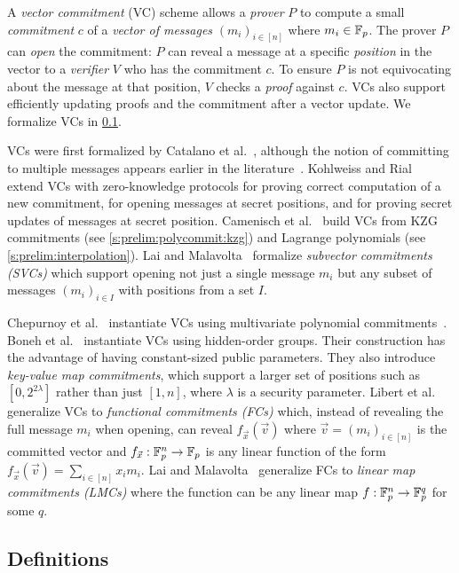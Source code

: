 A \textit{vector commitment} (VC) scheme allows a \textit{prover} $P$ to compute a small \textit{commitment} $c$ of a \textit{vector of messages} $(m_i)_{i\in[n]}$ where $m_i\in \mathbb{F}_p$.
The prover $P$ can \textit{open} the commitment: $P$ can reveal a message at a specific \textit{position} in the vector to a \textit{verifier} $V$ who has the commitment $c$.
To ensure $P$ is not equivocating about the message at that position, $V$ checks a \textit{proof} against $c$.
VCs also support efficiently updating proofs and the commitment after a vector update.
We formalize VCs in \cref{s:prelim:vcs:defs}.

VCs were first formalized by Catalano et al.~\cite{CF13}, although the notion of committing to multiple messages appears earlier in the literature~\cite{KZG10a,CFM08,LY10}.
Kohlweiss and Rial~\cite{KR13} extend VCs with zero-knowledge protocols for proving correct computation of a new commitment, for opening messages at secret positions, and for proving secret updates of messages at secret position.
Camenisch et al.~\cite{CDHK15} build VCs from KZG commitments (see \cref{s:prelim:polycommit:kzg}) and Lagrange polynomials (see \cref{s:prelim:interpolation}).
Lai and Malavolta~\cite{LM18} formalize \textit{subvector commitments (SVCs)} which support opening not just a single message $m_i$ but any subset of messages $(m_i)_{i\in I}$ with positions from a set $I$.

Chepurnoy et al.~\cite{CPZ18} instantiate VCs using multivariate polynomial commitments~\cite{PST13}.
Boneh et al.~\cite{BBF19} instantiate VCs using hidden-order groups.
Their construction has the advantage of having constant-sized public parameters.
They also introduce \textit{key-value map commitments}, which support a larger set of positions such as $[0, 2^{2\lambda}]$ rather than just $[1,n]$, where $\lambda$ is a security parameter.
Libert et al.~\cite{LRY16} generalize VCs to \textit{functional commitments (FCs)} which, instead of revealing the full message $m_i$ when opening, can reveal $f_{\vec{x}}(\vec{v})$ where $\vec{v} = (m_i)_{i\in[n]}$ is the committed vector and $f_{\vec{x}} : \mathbb{F}_p^n \rightarrow \mathbb{F}_p$ is any linear function of the form $f_{\vec{x}}(\vec{v}) = \sum_{i\in[n]} x_i m_i$.
Lai and Malavolta~\cite{LM18} generalize FCs to \textit{linear map commitments (LMCs)} where the function can be any linear map $f : \mathbb{F}_p^n \rightarrow \mathbb{F}_p^q$ for some $q$.

\subsection{Definitions}
\label{s:prelim:vcs:defs}

